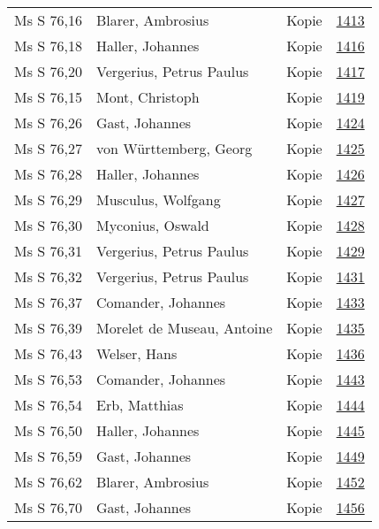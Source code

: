 \documentclass[10pt,a4paper,landscape]{report}
\begin{document}
\begin{longtable}{p{16cm}p{4cm}lr}
Ms S 76,16	&	Blarer, Ambrosius	&	Kopie	&	\href{http://130.60.24.72/assignment/1413}{1413}\\
Ms S 76,18	&	Haller, Johannes	&	Kopie	&	\href{http://130.60.24.72/assignment/1416}{1416}\\
Ms S 76,20	&	Vergerius, Petrus Paulus	&	Kopie	&	\href{http://130.60.24.72/assignment/1417}{1417}\\
Ms S 76,15	&	Mont, Christoph	&	Kopie	&	\href{http://130.60.24.72/assignment/1419}{1419}\\
Ms S 76,26	&	Gast, Johannes	&	Kopie	&	\href{http://130.60.24.72/assignment/1424}{1424}\\
Ms S 76,27	&	von Württemberg, Georg	&	Kopie	&	\href{http://130.60.24.72/assignment/1425}{1425}\\
Ms S 76,28	&	Haller, Johannes	&	Kopie	&	\href{http://130.60.24.72/assignment/1426}{1426}\\
Ms S 76,29	&	Musculus, Wolfgang	&	Kopie	&	\href{http://130.60.24.72/assignment/1427}{1427}\\
Ms S 76,30	&	Myconius, Oswald	&	Kopie	&	\href{http://130.60.24.72/assignment/1428}{1428}\\
Ms S 76,31	&	Vergerius, Petrus Paulus	&	Kopie	&	\href{http://130.60.24.72/assignment/1429}{1429}\\
Ms S 76,32	&	Vergerius, Petrus Paulus	&	Kopie	&	\href{http://130.60.24.72/assignment/1431}{1431}\\
Ms S 76,37	&	Comander, Johannes	&	Kopie	&	\href{http://130.60.24.72/assignment/1433}{1433}\\
Ms S 76,39	&	Morelet de Museau, Antoine	&	Kopie	&	\href{http://130.60.24.72/assignment/1435}{1435}\\
Ms S 76,43	&	Welser, Hans	&	Kopie	&	\href{http://130.60.24.72/assignment/1436}{1436}\\
Ms S 76,53	&	Comander, Johannes	&	Kopie	&	\href{http://130.60.24.72/assignment/1443}{1443}\\
Ms S 76,54	&	Erb, Matthias	&	Kopie	&	\href{http://130.60.24.72/assignment/1444}{1444}\\
Ms S 76,50	&	Haller, Johannes	&	Kopie	&	\href{http://130.60.24.72/assignment/1445}{1445}\\
Ms S 76,59	&	Gast, Johannes	&	Kopie	&	\href{http://130.60.24.72/assignment/1449}{1449}\\
Ms S 76,62	&	Blarer, Ambrosius	&	Kopie	&	\href{http://130.60.24.72/assignment/1452}{1452}\\
Ms S 76,70	&	Gast, Johannes	&	Kopie	&	\href{http://130.60.24.72/assignment/1456}{1456}\\

\end{longtable}
\end{document}
